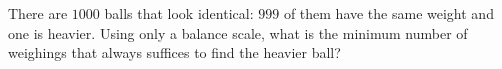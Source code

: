 There are $1000$ balls that look identical: $999$ of them have the same weight and one is heavier. Using only a balance scale, what is the minimum number of weighings that always suffices to find the heavier ball?
